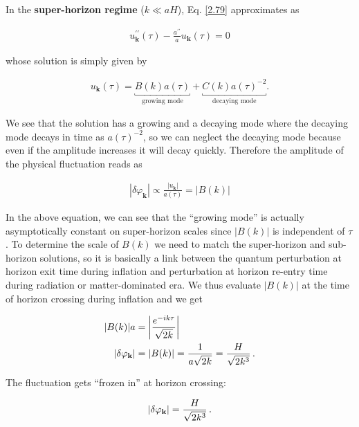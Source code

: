 In the \textbf{super-horizon regime} ($k \ll aH$), Eq. \ref{2.79} approximates as

\begin{align}
    u_{\mathbf{k}}^{\prime \prime}(\tau)-\frac{a^{\prime \prime}}{a} u_{\mathbf{k}}(\tau)=0 \label{2.81}
\end{align}



whose solution is simply given by

\begin{align}
    u_{\mathbf{k}}(\tau)=\underbracket{B(k) a(\tau)}_{\text{growing mode}}+ \underbracket{C(k) a(\tau)^{-2}}_{\text{decaying mode}} .\label{2.82}
\end{align}

 We see that  the solution has a growing and a decaying mode where the decaying mode decays in time as $a(\tau)^{-2}$, so we can neglect the decaying mode because even if the amplitude increases it will decay quickly. Therefore the amplitude of the physical fluctuation reads as

\begin{align}
    \left|\delta \varphi_{\mathbf{k}}\right| \propto \frac{\left|u_{\mathbf{k}}\right|}{a(\tau)}=|B(k)| \label{2.83}
\end{align}

In the above equation, we can see that the “growing
mode” is actually asymptotically constant on super-horizon scales since $|B(k)|$ is independent of $\tau$.
To determine the scale of $B(k)$ we need to match the super-horizon and sub-horizon solutions, so it is basically a link between the quantum perturbation at horizon exit time during inflation and perturbation at horizon re-entry time during radiation or matter-dominated era. We thus evaluate $|B(k)|$ at the time of horizon crossing during inflation and we get

\begin{align}
    \abs{B(k)} a &= \abs{\frac{e^{-ik \tau }}{\sqrt{2 k}}} \label{2.84}  \\
    \abs{ \delta \varphi _\textbf{k}} &= \abs{B(k)} = \frac{1}{a \sqrt{2k}} 
    = \frac{H}{\sqrt{2 k^3}}\label{2.85}
    \,.
\end{align}

The fluctuation gets ``frozen in'' at horizon crossing: 

\begin{align}
    \abs{ \delta \varphi _\textbf{k}} = \frac{H}{\sqrt{2 k^3}}
    \,.
\end{align}

